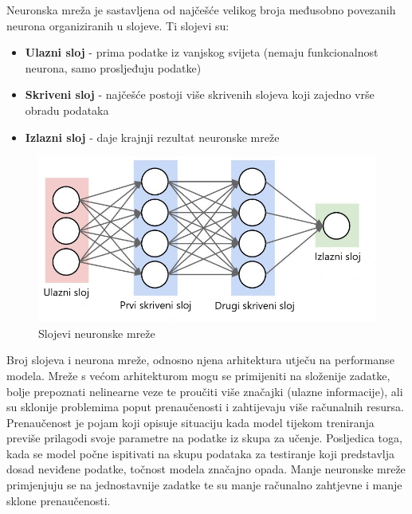 \documentclass[seminarskirad]{fer}
\begin{document}
Neuronska mreža je sastavljena od najčešće velikog broja međusobno povezanih neurona organiziranih u slojeve. Ti slojevi su:
\begin{itemize}
	\item \textbf{Ulazni sloj} - prima podatke iz vanjskog svijeta (nemaju funkcionalnost neurona, samo prosljeđuju podatke)
	\item \textbf{Skriveni sloj} - najčešće postoji više skrivenih slojeva koji zajedno vrše obradu podataka
	\item \textbf{Izlazni sloj} - daje krajnji rezultat neuronske mreže
\end{itemize}

\begin{figure}[htb]
	\centering
	\includegraphics[width=0.56\linewidth]{Figures/neuronskaprimjer.jpg} 
	\caption{Slojevi neuronske mreže}
	\label{slk:neuronskaprimjer}
\end{figure}

Broj slojeva i neurona mreže, odnosno njena arhitektura utječu na performanse modela. Mreže s većom arhitekturom mogu se primijeniti na složenije zadatke, bolje prepoznati nelinearne veze te proučiti više značajki (ulazne informacije), ali su sklonije problemima poput prenaučenosti i zahtijevaju više računalnih resursa. Prenaučenost je pojam koji opisuje situaciju kada model tijekom treniranja previše prilagodi svoje parametre na podatke iz skupa za učenje. Posljedica toga, kada se model počne ispitivati na skupu podataka za testiranje koji predstavlja dosad neviđene podatke, točnost modela značajno opada. Manje neuronske mreže primjenjuju se na jednostavnije zadatke te su manje računalno zahtjevne i manje sklone prenaučenosti.
\end{document}
